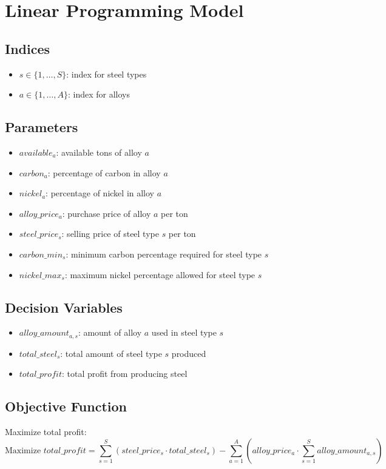 \documentclass{article}
\begin{document}
\section*{Linear Programming Model}

\subsection*{Indices}
\begin{itemize}
    \item $s \in \{1, \ldots, S\}$: index for steel types
    \item $a \in \{1, \ldots, A\}$: index for alloys
\end{itemize}

\subsection*{Parameters}
\begin{itemize}
    \item $available_{a}$: available tons of alloy $a$
    \item $carbon_{a}$: percentage of carbon in alloy $a$
    \item $nickel_{a}$: percentage of nickel in alloy $a$
    \item $alloy\_price_{a}$: purchase price of alloy $a$ per ton
    \item $steel\_price_{s}$: selling price of steel type $s$ per ton
    \item $carbon\_min_{s}$: minimum carbon percentage required for steel type $s$
    \item $nickel\_max_{s}$: maximum nickel percentage allowed for steel type $s$
\end{itemize}

\subsection*{Decision Variables}
\begin{itemize}
    \item $alloy\_amount_{a,s}$: amount of alloy $a$ used in steel type $s$
    \item $total\_steel_{s}$: total amount of steel type $s$ produced
    \item $total\_profit$: total profit from producing steel
\end{itemize}

\subsection*{Objective Function}
Maximize total profit:
\[
\text{Maximize } total\_profit = \sum_{s=1}^{S} (steel\_price_{s} \cdot total\_steel_{s}) - \sum_{a=1}^{A} (alloy\_price_{a} \cdot \sum_{s=1}^{S} alloy\_amount_{a,s})
\]
\end{document}
